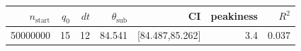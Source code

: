 \begin{tabular}{r r r r r r r}
\hline
$n_{\mathrm{start}}$ & $q_0$ & $dt$ & $\theta_{\mathrm{sub}}$ & CI & peakiness & $R^2$ \\
\hline
50000000 & 15 & 12 & 84.541 & [84.487,85.262] & 3.4 & 0.037 \\
\hline
\end{tabular}
